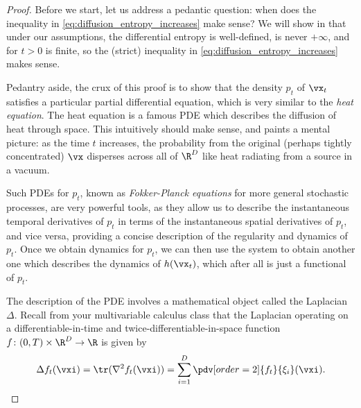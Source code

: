 \documentclass[../../book-main.tex]{subfiles}
\begin{document}
\begin{proof}
    Before we start, let us address a pedantic question: when does the inequality in \eqref{eq:diffusion_entropy_increases} make sense? We will show in  that under our assumptions, the differential entropy is well-defined, is never \(+\infty\), and for \(t > 0\) is finite, so the (strict) inequality in \eqref{eq:diffusion_entropy_increases} makes sense.

    Pedantry aside, the crux of this proof is to show that the density \(p_{t}\) of \(\vx_{t}\) satisfies a particular partial differential equation, which is very similar to the \textit{heat equation}. The heat equation is a famous PDE which describes the diffusion of heat through space. This intuitively should make sense, and paints a mental picture: as the time \(t\) increases, the probability from the original (perhaps tightly concentrated) \(\vx\) disperses across all of \(\R^{D}\) like heat radiating from a source in a vacuum.
    
    Such PDEs for \(p_{t}\), known as \textit{Fokker-Planck equations} for more general stochastic processes, are very powerful tools, as they allow us to describe the instantaneous temporal derivatives of \(p_{t}\) in terms of the instantaneous spatial derivatives of \(p_{t}\), and vice versa, providing a concise description of the regularity and dynamics of \(p_{t}\). Once we obtain dynamics for \(p_{t}\), we can then use the system to obtain another one which describes the dynamics of \(h(\vx_{t})\), which after all is just a functional of \(p_{t}\).  

    The description of the PDE involves a mathematical object called the Laplacian \(\Delta\). Recall from your multivariable calculus class that the Laplacian operating on a differentiable-in-time and twice-differentiable-in-space function \(f \colon (0, T) \times \R^{D} \to \R\) is given by
    \begin{equation}
        \Delta f_{t}(\vxi) = \tr(\nabla^{2}f_{t}(\vxi)) = \sum_{i = 1}^{D}\pdv[order=2]{f_{t}}{\xi_{i}}(\vxi).
    \end{equation}
    

\end{proof}
\end{document}

